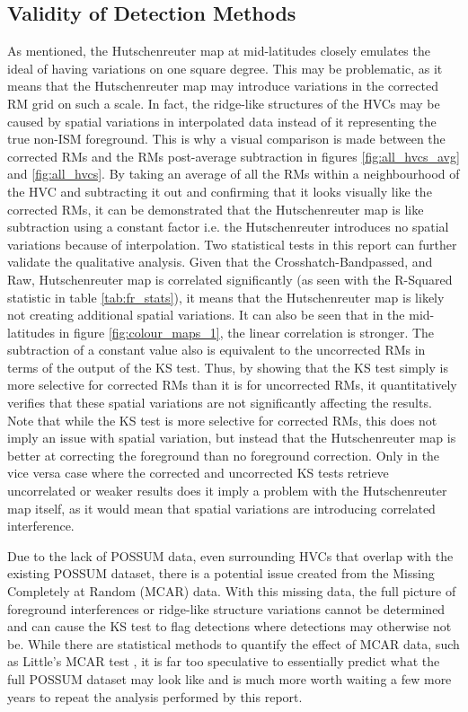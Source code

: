 \subsection{Validity of Detection Methods}
\label{ssec:B5}

As mentioned, the Hutschenreuter map at mid-latitudes closely emulates the ideal of having variations on one square degree.  This may be problematic, as it means that the Hutschenreuter map may introduce variations in the corrected RM grid on such a scale. In fact, the ridge-like structures of the HVCs may be caused by spatial variations in interpolated data instead of it representing the true non-ISM foreground. This is why a visual comparison is made between the corrected RMs and the RMs post-average subtraction in figures \ref{fig:all_hvcs_avg} and \ref{fig:all_hvcs}. By taking an average of all the RMs within a neighbourhood of the HVC and subtracting it out and confirming that it looks visually like the corrected RMs, it can be demonstrated that the Hutschenreuter map is like subtraction using a constant factor i.e. the Hutschenreuter introduces no spatial variations because of interpolation. Two statistical tests in this report can further validate the qualitative analysis. Given that the Crosshatch-Bandpassed, and Raw, Hutschenreuter map is correlated significantly (as seen with the R-Squared statistic in table \ref{tab:fr_stats}), it means that the Hutschenreuter map is likely not creating additional spatial variations. It can also be seen that in the mid-latitudes in figure \ref{fig:colour_maps_1}, the linear correlation is stronger. The subtraction of a constant value also is equivalent to the uncorrected RMs in terms of the output of the KS test. Thus, by showing that the KS test simply is more selective for corrected RMs than it is for uncorrected RMs, it quantitatively verifies that these spatial variations are not significantly affecting the results. Note that while the KS test is more selective for corrected RMs, this does not imply an issue with spatial variation, but instead that the Hutschenreuter map is better at correcting the foreground than no foreground correction. Only in the vice versa case where the corrected and uncorrected KS tests retrieve uncorrelated or weaker results does it imply a problem with the Hutschenreuter map itself, as it would mean that spatial variations are introducing correlated interference.


Due to the lack of POSSUM data, even surrounding HVCs that overlap with the existing POSSUM dataset, there is a potential issue created from the Missing Completely at Random (MCAR) data. With this missing data, the full picture of foreground interferences or ridge-like structure variations cannot be determined and can cause the KS test to flag detections where detections may otherwise not be. While there are statistical methods to quantify the effect of MCAR data, such as Little's MCAR test \citep{ID72}, it is far too speculative to essentially predict what the full POSSUM dataset may look like and is much more worth waiting a few more years to repeat the analysis performed by this report.


